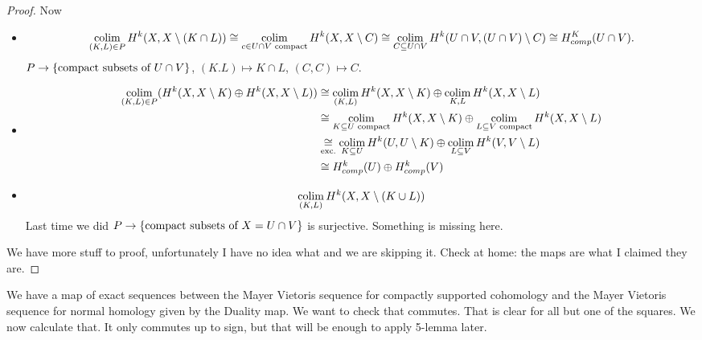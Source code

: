 \documentclass[language=english]{TemplateLecture}
\begin{document}
\begin{construction}
\begin{proof}
        Now
        \begin{itemize}
            \item \[\operatorname*{\mathrm{colim}}_{(K,L) \in P} H^k(X, X\setminus (K \cap L)) \cong \operatorname*{\mathrm{colim}}_{c \in U \cap V \text{ compact}} H^k(X, X\setminus C) \cong \operatorname*{\mathrm{colim}}_{C \subseteq U \cap V} H^k(U \cap V, (U \cap V) \setminus C) \cong H_{comp}^K(U \cap V).\]
            \(P \to \{\text{compact subsets of } U \cap V\}\), \((K.L) \mapsto K \cap L\), \((C,C) \mapsto C\).
            \item \[\begin{split}
                \operatorname*{\mathrm{colim}}_{(K,L) \in P}(H^k(X, X\setminus K) \oplus H^k(X, X\setminus L)) &\cong \operatorname*{\mathrm{colim}}_{(K,L)} H^k(X,X\setminus K) \oplus \operatorname*{\mathrm{colim}}_{K,L} H^k(X, X\setminus L) \\
                &\cong \operatorname*{\mathrm{colim}}_{K \subseteq U\text{ compact}} H^k(X, X\setminus K) \oplus \operatorname*{\mathrm{colim}}_{L \subseteq V \text{ compact}} H^k(X, X\setminus L) \\
                &\underset{\text{exc.}}{\cong} \operatorname*{\mathrm{colim}}_{K \subseteq U} H^k(U, U \setminus K) \oplus \operatorname*{\mathrm{colim}}_{L \subseteq V} H^k(V, V\setminus L) \\
                &\cong H_{comp}^k(U) \oplus H_{comp}^k(V)
            \end{split}\]
            \item \[\operatorname*{\mathrm{colim}}_{(K,L)} H^k(X, X\setminus (K \cup L))\]
            Last time we did \(P \to \{\text{compact subsets of } X = U \cap V\}\) is surjective. Something is missing here.
        \end{itemize}

        We have more stuff to proof, unfortunately I have no idea what and we are skipping it. Check at home: the maps are what I claimed they are.
    \end{proof}
\end{construction}

\begin{proposition}
    We have a map of exact sequences between the Mayer Vietoris sequence for compactly supported cohomology and the Mayer Vietoris sequence for normal homology given by the Duality map. We want to check that commutes. That is clear for all but one of the squares. We now calculate that. It only commutes up to sign, but that will be enough to apply 5-lemma later.
\end{proposition}
\end{document}
